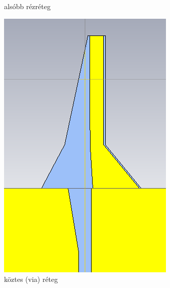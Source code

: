 \begin{figure}[h]
\begin{subfigure}[b]{0.3\textwidth}
		\caption{alsóbb rézréteg}
	\end{subfigure}
	\hfill
	\begin{subfigure}[b]{0.3\textwidth}
		\centering
		\includegraphics[width=\textwidth]{kep/results/balun_2.png}
		\caption{köztes (via) réteg}
	\end{subfigure}
	\hfill
	\begin{subfigure}[b]{0.3\textwidth}
		\centering

\end{subfigure}
\end{figure}
